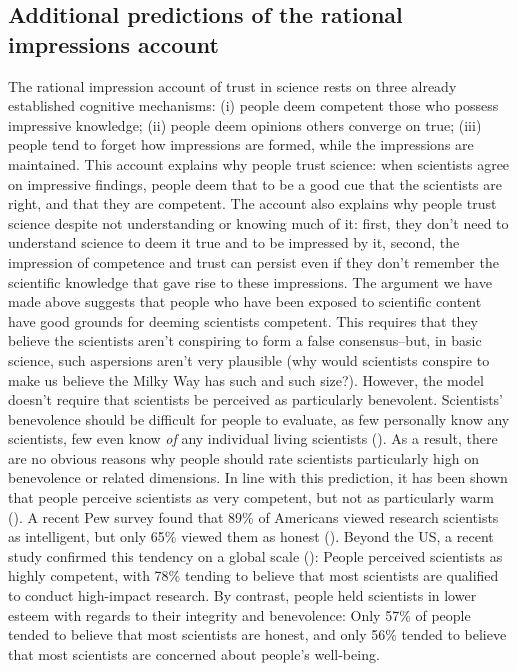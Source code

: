 \documentclass[
  jou,
  floatsintext,
  longtable,
  nolmodern,
  notxfonts,
  notimes,
  colorlinks=true,linkcolor=blue,citecolor=blue,urlcolor=blue]{apa7}
\begin{document}
\subsection{Additional predictions of the rational impressions
account}\label{additional-predictions-of-the-rational-impressions-account}

The rational impression account of trust in science rests on three
already established cognitive mechanisms: (i) people deem competent
those who possess impressive knowledge; (ii) people deem opinions others
converge on true; (iii) people tend to forget how impressions are
formed, while the impressions are maintained. This account explains why
people trust science: when scientists agree on impressive findings,
people deem that to be a good cue that the scientists are right, and
that they are competent. The account also explains why people trust
science despite not understanding or knowing much of it: first, they
don't need to understand science to deem it true and to be impressed by
it, second, the impression of competence and trust can persist even if
they don't remember the scientific knowledge that gave rise to these
impressions. The argument we have made above suggests that people who
have been exposed to scientific content have good grounds for deeming
scientists competent. This requires that they believe the scientists
aren't conspiring to form a false consensus--but, in basic science, such
aspersions aren't very plausible (why would scientists conspire to make
us believe the Milky Way has such and such size?). However, the model
doesn't require that scientists be perceived as particularly benevolent.
Scientists' benevolence should be difficult for people to evaluate, as
few personally know any scientists, few even know \emph{of} any
individual living scientists
(). As a result, there are no obvious reasons why people should rate
scientists particularly high on benevolence or related dimensions. In
line with this prediction, it has been shown that people perceive
scientists as very competent, but not as particularly warm
(). A
recent Pew survey found that 89\% of Americans viewed research
scientists as intelligent, but only 65\% viewed them as honest
(). Beyond the US, a recent study confirmed this tendency on a
global scale (): People perceived scientists as highly competent, with 78\%
tending to believe that most scientists are qualified to conduct
high-impact research. By contrast, people held scientists in lower
esteem with regards to their integrity and benevolence: Only 57\% of
people tended to believe that most scientists are honest, and only 56\%
tended to believe that most scientists are concerned about people's
well-being.
\end{document}
